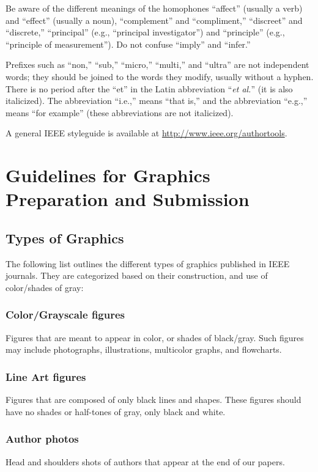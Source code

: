 \documentclass{IEEEtran}
\begin{document}
Be aware of the different meanings of the homophones ``affect'' (usually a 
verb) and ``effect'' (usually a noun), ``complement'' and ``compliment,'' 
``discreet'' and ``discrete,'' ``principal'' (e.g., ``principal 
investigator'') and ``principle'' (e.g., ``principle of measurement''). Do 
not confuse ``imply'' and ``infer.'' 

Prefixes such as ``non,'' ``sub,'' ``micro,'' ``multi,'' and ``ultra'' are 
not independent words; they should be joined to the words they modify, 
usually without a hyphen. There is no period after the ``et'' in the Latin 
abbreviation ``\emph{et al.}'' (it is also italicized). The abbreviation ``i.e.,'' means 
``that is,'' and the abbreviation ``e.g.,'' means ``for example'' (these 
abbreviations are not italicized).

A general IEEE styleguide is available at \underline{http://www.ieee.org/authortools}.

\section{Guidelines for Graphics Preparation and Submission}
\label{sec:guidelines}

\subsection{Types of Graphics}
The following list outlines the different types of graphics published in 
IEEE journals. They are categorized based on their construction, and use of 
color/shades of gray:

\subsubsection{Color/Grayscale figures}
{Figures that are meant to appear in color, or shades of black/gray. Such 
figures may include photographs, illustrations, multicolor graphs, and 
flowcharts.}

\subsubsection{Line Art figures}
{Figures that are composed of only black lines and shapes. These figures 
should have no shades or half-tones of gray, only black and white.}

\subsubsection{Author photos}
{Head and shoulders shots of authors that appear at the end of our papers. }
\end{document}
